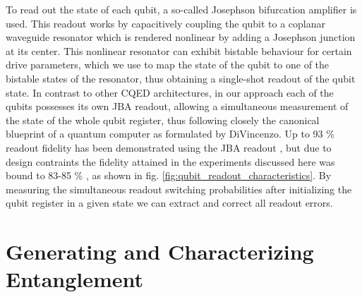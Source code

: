 To read out the state of each qubit, a so-called Josephson bifurcation amplifier \citep{siddiqi_dispersive_2006,mallet_single-shot_2009} is used. This readout works by capacitively coupling the qubit to a coplanar waveguide resonator which is rendered nonlinear by adding a Josephson junction at its center. This nonlinear resonator can exhibit bistable behaviour for certain drive parameters, which we use to map the state of the qubit to one of the bistable states of the resonator, thus obtaining a single-shot readout of the qubit state. In contrast to other CQED architectures, in our approach each of the qubits possesses its own JBA readout, allowing a simultaneous measurement of the state of the whole qubit register, thus following closely the canonical blueprint of a quantum computer as formulated by DiVincenzo. Up to 93 \% readout fidelity has been demonstrated using the JBA readout \citep{mallet_single-shot_2009}, but due to design contraints the fidelity attained in the experiments discussed here was bound to 83-85 \% , as shown in fig. \ref{fig:qubit_readout_characteristics}. By measuring the simultaneous readout switching probabilities after initializing the qubit register in a given state we can extract and correct all readout errors.

\section{Generating and Characterizing Entanglement}

